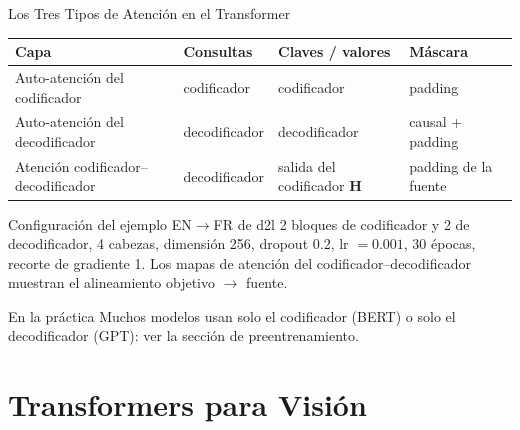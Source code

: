 \documentclass[aspectratio=169, 10pt]{beamer}
\begin{document}
\begin{frame}{Los Tres Tipos de Atenci\'on en el Transformer}
	\begin{center}
		\small
		\begin{tabular}{p{3.8cm}p{2.4cm}p{2.4cm}p{3.2cm}}
			\toprule
			Capa & Consultas & Claves / valores & M\'ascara\\
			\midrule
			Auto-atenci\'on del codificador & codificador & codificador & padding\\
			Auto-atenci\'on del decodificador & decodificador & decodificador & causal + padding\\
			Atenci\'on codificador--decodificador & decodificador & salida del codificador $\mathbf{H}$ & padding de la fuente\\
			\bottomrule
		\end{tabular}
	\end{center}
	\begin{block}{Configuraci\'on del ejemplo EN$\to$FR de d2l}
		\small
		2 bloques de codificador y 2 de decodificador, 4 cabezas, dimensi\'on 256, dropout 0.2, lr $=0.001$, 30 \'epocas, recorte de gradiente 1.
		Los mapas de atenci\'on del codificador--decodificador muestran el alineamiento objetivo $\to$ fuente.
	\end{block}
	\begin{alertblock}{En la pr\'actica}
		\small
		Muchos modelos usan solo el codificador (BERT) o solo el decodificador (GPT): ver la secci\'on de preentrenamiento.
	\end{alertblock}
\end{frame}

\section{Transformers para Visi\'on}
\end{document}
